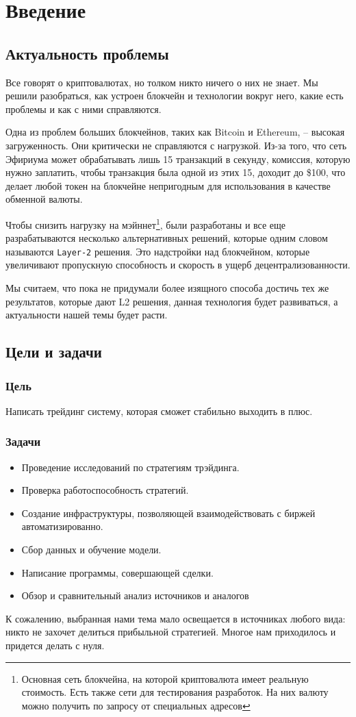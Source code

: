 \section{Введение}

\subsection{Актуальность проблемы}
Все говорят о криптовалютах, но толком никто ничего о них не знает. Мы решили разобраться, как устроен блокчейн и технологии вокруг него, какие есть проблемы и как с ними справляются.

Одна из проблем больших блокчейнов, таких как Bitcoin и Ethereum, -- высокая загруженность. Они критически не справляются с нагрузкой. Из-за того, что сеть Эфириума может обрабатывать лишь 15 транзакций в секунду, комиссия, которую нужно заплатить, чтобы транзакция была одной из этих 15, доходит до \$100, что делает любой токен на блокчейне непригодным для использования в качестве обменной валюты.


Чтобы снизить нагрузку на мэйннет\footnote{Основная сеть блокчейна, на которой криптовалюта имеет реальную стоимость. Есть также сети для тестирования разработок. На них валюту можно получить по запросу от специальных адресов}, были разработаны и все еще разрабатываются несколько альтернативных решений, которые одним словом называются \texttt{Layer-2} решения. Это надстройки над блокчейном, которые увеличивают пропускную способность и скорость в ущерб децентрализованности.


Мы считаем, что пока не придумали более изящного способа достичь тех же результатов, которые дают L2 решения, данная технология будет развиваться, а актуальности нашей темы будет расти.


\subsection{Цели и задачи}
\subsubsection{Цель}
Написать трейдинг систему, которая сможет стабильно выходить в плюс.
\subsubsection{Задачи}
\begin{itemize}
\item Проведение исследований по стратегиям трэйдинга.
\item Проверка работоспособность стратегий.
\item Создание инфраструктуры, позволяющей взаимодействовать с биржей автоматизированно.
\item Сбор данных и обучение модели.
\item Написание программы, совершающей сделки.
\item Обзор и сравнительный анализ источников и аналогов
\end{itemize}
К сожалению, выбранная нами тема мало освещается в источниках любого вида: никто не захочет делиться прибыльной стратегией. Многое нам приходилось и придется делать с нуля.
